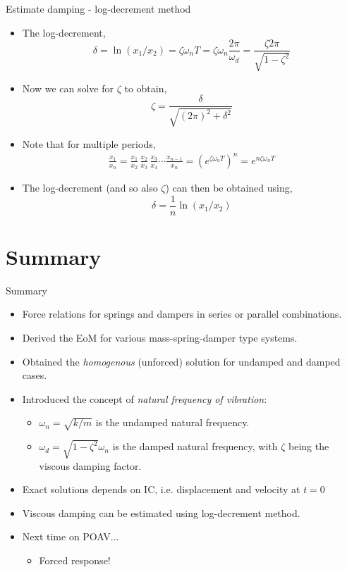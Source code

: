 \documentclass[11pt,aspectratio=169,handout]{beamer}
\begin{document}
\begin{frame}[c]{Estimate damping - log-decrement method}
	\begin{itemize}
		\item<1-> The log-decrement, 
		\begin{equation}
			\delta = \ln(x_1/x_2) = \zeta\omega_n T = \zeta\omega_n \frac{2\pi }{\omega_d} = \frac{\zeta 2\pi}{\sqrt{1-\zeta^2}}
		\end{equation}
	\item<2-> Now we can solve for $\zeta$ to obtain,
	\begin{equation}
		\zeta = \frac{\delta}{\sqrt{(2\pi)^2 + \delta^2}}
	\end{equation}
	\item<3-> Note that for multiple periods, 
	\begin{align}
		\frac{x_1}{x_n} = \frac{x_1}{x_2}\, \frac{x_2}{x_3}  \, \frac{x_3}{x_4} \cdots \frac{x_{n-1}}{x_n} = (e^{\zeta\omega_nT})^n= e^{n\zeta\omega_nT}
	\end{align}
	\item<3-> The log-decrement (and so also $\zeta$) can then be obtained using,
	\begin{equation}
		\delta = \frac{1}{n} \ln(x_1/x_2)
	\end{equation}
	\end{itemize}
\end{frame}

\section*{Summary}
\begin{frame}[c]{Summary}
	\begin{itemize}
		\item<1-> Force relations for springs and dampers in series or parallel combinations. 
		\item<2-> Derived the EoM for various mass-spring-damper type systems.
		\item<3-> Obtained the \textit{homogenous} (unforced) solution for undamped and damped cases.
		\item<4-> Introduced the concept of \textit{natural frequency of vibration}:
		\begin{itemize}
			\item[-] $\omega_n=\sqrt{k/m}$ is the undamped natural frequency. 
			\item[-] $\omega_d = \sqrt{1-\zeta^2}\omega_n$ is the damped natural frequency, with $\zeta$ being the viscous damping factor.
			\end{itemize}
		\item<5-> Exact solutions depends on IC, i.e. displacement and velocity at $t=0$
		\item<6-> Viscous damping can be estimated using log-decrement method.\\[0.5cm]
		\item<7-> Next time on POAV...
		\begin{itemize}
			\item[-] Forced response!
		\end{itemize}
	\end{itemize}
\end{frame}
\end{document}
